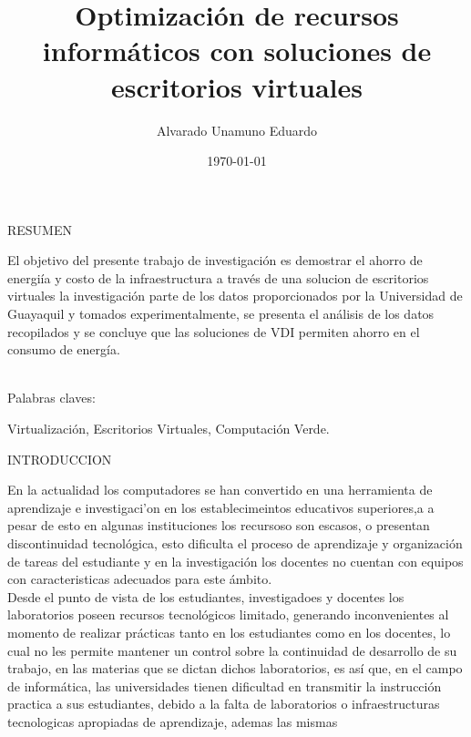 \documentclass[a4paper,11pt]{article}
\begin{document}
\title{Optimizaci\'on de recursos inform\'aticos con soluciones de escritorios virtuales}
\author{Alvarado Unamuno Eduardo}
\date{\today}
\maketitle
\begin{bf}
\begin{center}
RESUMEN \\
\end{center}
\end{bf}
El objetivo del presente trabajo de investigaci\'on es demostrar 
el ahorro de energi\'ia y costo de la infraestructura a trav\'es 
de una solucion de escritorios virtuales la investigaci\'on parte de los datos proporcionados 
por la Universidad de Guayaquil y tomados experimentalmente, se presenta el an\'alisis de los 
datos recopilados y se concluye que las soluciones de VDI permiten ahorro en el consumo de energ\'ia.\\   
\\
\begin{bf}
Palabras claves:
\end{bf}
Virtualizaci\'on, Escritorios Virtuales, Computación Verde. \\
\begin{bf}
\begin{center}
INTRODUCCION\\
\end{center}
\end{bf}
En la actualidad los computadores se han convertido en una herramienta de 
aprendizaje e investigaci'on en los establecimeintos educativos superiores,a a pesar de esto
en algunas instituciones los recursoso son escasos, o presentan discontinuidad
tecnol\'ogica, esto dificulta el proceso de aprendizaje y organizaci\'on de
tareas del estudiante y en la investigaci\'on los docentes no cuentan con
equipos con caracteristicas adecuados para este \'ambito.\\
Desde el punto de vista de los estudiantes, investigadoes y docentes los laboratorios
poseen recursos tecnol\'ogicos limitado, generando inconvenientes al momento
de realizar pr\'acticas tanto en los estudiantes como en los docentes,
lo cual no les permite mantener un control sobre la continuidad de desarrollo de su trabajo,
en las materias que se dictan dichos laboratorios, es as\'i que, en el campo de informática, 
las universidades tienen dificultad en transmitir la instrucci\'on practica a sus estudiantes, debido
a la falta de laboratorios o infraestructuras tecnologicas apropiadas de aprendizaje, ademas las mismas
\end{document}
